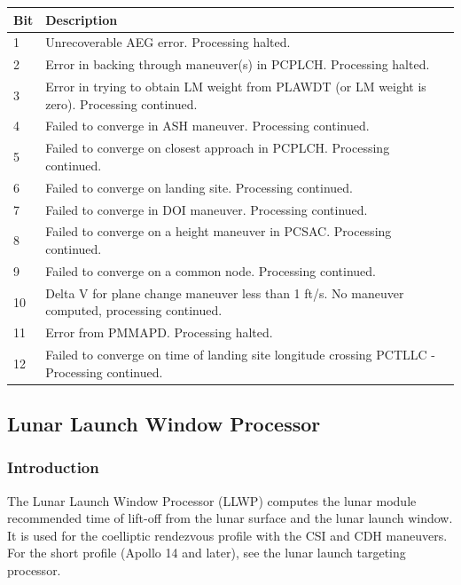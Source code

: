 \documentclass[11pt]{article} %
\begin{document}
\begin{center}
\begin{tabular}{ | l | m{12cm} |}
\hline
Bit&Description\\
\hline
1&Unrecoverable AEG error. Processing halted.\\
\hline
2&Error in backing through maneuver(s) in PCPLCH. Processing halted.\\
\hline
3&Error in trying to obtain LM weight from PLAWDT (or LM weight is zero). Processing continued.\\
\hline
4&Failed to converge in ASH maneuver. Processing continued.\\
\hline
5&Failed to converge on closest approach in PCPLCH. Processing continued.\\
\hline
6&Failed to converge on landing site. Processing continued.\\
\hline
7&Failed to converge in DOI maneuver. Processing continued.\\
\hline
8&Failed to converge on a height maneuver in PCSAC. Processing continued.\\
\hline
9&Failed to converge on a common node. Processing continued.\\
\hline
10&Delta V for plane change maneuver less than 1 ft/s. No maneuver computed, processing continued.\\
\hline
11&Error from PMMAPD. Processing halted.\\
\hline
12&Failed to converge on time of landing site longitude crossing PCTLLC - Processing continued.\\
\hline
\end{tabular}
\end{center}
\newpage
\subsection{Lunar Launch Window Processor}
\subsubsection{Introduction}
The Lunar Launch Window Processor (LLWP) computes the lunar module recommended time of lift-off from the lunar surface and the lunar launch window. It is used for the coelliptic rendezvous profile with the CSI and CDH maneuvers. For the short profile (Apollo 14 and later), see the lunar launch targeting processor.\\
\end{document}
